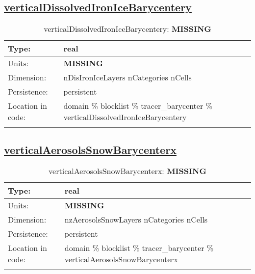 \subsection[verticalDissolvedIronIceBarycentery]{\hyperref[sec:var_tab_tracer_barycenter]{verticalDissolvedIronIceBarycentery}}
\label{subsec:var_sec_tracer_barycenter_verticalDissolvedIronIceBarycentery}
\begin{center}
\begin{longtable}{| p{2.0in} | p{4.0in} |}
        \hline 
        Type: & real \\
        \hline 
        Units: & {\bf \color{red} MISSING} \\
        \hline 
        Dimension: & nDisIronIceLayers nCategories nCells \\
        \hline 
        Persistence: & persistent \\
        \hline 
         Location in code: & domain \% blocklist \% tracer\_barycenter \% verticalDissolvedIronIceBarycentery \\
         \hline 
    \caption{verticalDissolvedIronIceBarycentery: {\bf \color{red} MISSING}}
\end{longtable}
\end{center}
\subsection[verticalAerosolsSnowBarycenterx]{\hyperref[sec:var_tab_tracer_barycenter]{verticalAerosolsSnowBarycenterx}}
\label{subsec:var_sec_tracer_barycenter_verticalAerosolsSnowBarycenterx}
\begin{center}
\begin{longtable}{| p{2.0in} | p{4.0in} |}
        \hline 
        Type: & real \\
        \hline 
        Units: & {\bf \color{red} MISSING} \\
        \hline 
        Dimension: & nzAerosolsSnowLayers nCategories nCells \\
        \hline 
        Persistence: & persistent \\
        \hline 
         Location in code: & domain \% blocklist \% tracer\_barycenter \% verticalAerosolsSnowBarycenterx \\
         \hline 
    \caption{verticalAerosolsSnowBarycenterx: {\bf \color{red} MISSING}}
\end{longtable}
\end{center}
